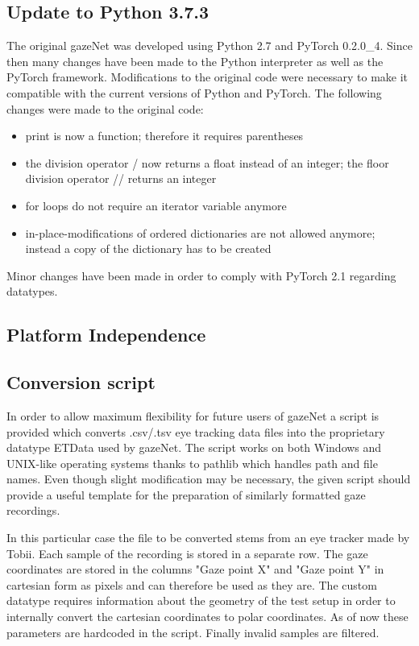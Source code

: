 \documentclass[conference]{IEEEtran}
\begin{document}
\subsection{Update to Python 3.7.3}
The original gazeNet was developed using Python 2.7 and PyTorch 0.2.0\_4. Since then many changes have been made to the Python interpreter as well as the PyTorch framework. Modifications to the original code were necessary to make it compatible with the current versions of Python and PyTorch. The following changes were made to the original code:
\begin{itemize}
    \item print is now a function; therefore it requires parentheses
    \item the division operator / now returns a float instead of an integer; the floor division operator // returns an integer
    \item for loops do not require an iterator variable anymore
    \item in-place-modifications of ordered dictionaries are not allowed anymore; instead a copy of the dictionary has to be created
\end{itemize}
Minor changes have been made in order to comply with PyTorch 2.1 regarding datatypes.

\subsection{Platform Independence}

\subsection{Conversion script}
In order to allow maximum flexibility for future users of gazeNet a script is provided which converts .csv/.tsv eye tracking data files into the proprietary datatype ETData used by gazeNet. The script works on both Windows and UNIX-like operating systems thanks to pathlib which handles path and file names. Even though slight modification may be necessary, the given script should provide a useful template for the preparation of similarly formatted gaze recordings.

In this particular case the file to be converted stems from an eye tracker made by Tobii. Each sample of the recording is stored in a separate row. The gaze coordinates are stored in the columns "Gaze point X" and "Gaze point Y" in cartesian form as pixels and can therefore be used as they are. The custom datatype requires information about the geometry of the test setup in order to internally convert the cartesian coordinates to polar coordinates. As of now these parameters are hardcoded in the script. Finally invalid samples are filtered.
\end{document}
